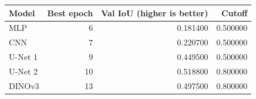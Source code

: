 \begin{tabular}{lrrr}
\toprule
Model & Best epoch & Val IoU (higher is better) & Cutoff \\
\midrule
MLP & 6 & 0.181400 & 0.500000 \\
CNN & 7 & 0.220700 & 0.500000 \\
U-Net 1 & 9 & 0.449500 & 0.500000 \\
U-Net 2 & 10 & 0.518800 & 0.800000 \\
DINOv3 & 13 & 0.497500 & 0.800000 \\
\bottomrule
\end{tabular}
